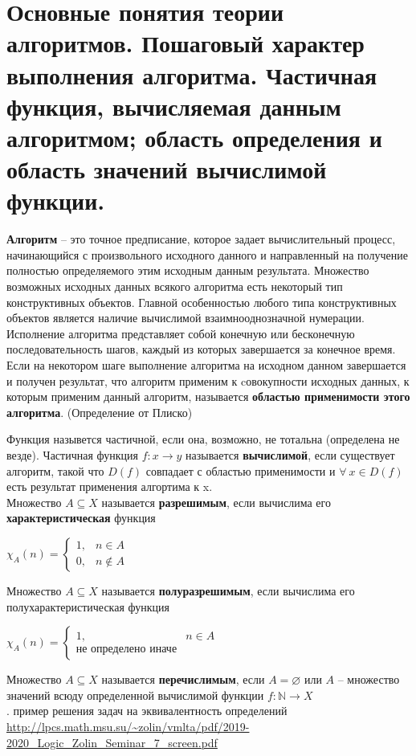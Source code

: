 \section{Основные понятия теории алгоритмов. Пошаговый характер выполнения алгоритма. Частичная функция, вычисляемая данным алгоритмом; область определения и область значений вычислимой функции.
}
\begin{definition}{
    \textbf{Алгоритм} -- это точное предписание, которое задает вычислительный процесс, начинающийся с произвольного исходного данного и направленный на получение полностью определяемого этим исходным данным результата. Множество возможных исходных данных всякого алгоритма есть некоторый тип конструктивных объектов. Главной особенностью любого типа конструктивных объектов является наличие вычислимой взаимнооднозначной нумерации. Исполнение алгоритма представляет собой конечную или бесконечную последовательность шагов, каждый из которых завершается за конечное время. Если на некотором шаге выполнение алгоритма на исходном данном завершается и получен результат, что алгоритм применим к cовокупности исходных данных, к которым применим данный алгоритм, называется \textbf{областью применимости этого алгоритма}. (Определение от Плиско)
  }
\end{definition}
Функция назывется частичной, если она, возможно, не тотальна (определена не везде). Частичная функция $f: x \rightarrow y$ называется \textbf{вычислимой}, если существует алгоритм, такой что $D(f)$ совпадает с областью применимости и $\forall \:x\in D(f)$ есть результат применения алгортима к x.\\
Множество $A\subseteq X$ называется \textbf{разрешимым}, если вычислима его \textbf{характеристическая} функция
\begin{center}
    $\chi_{A}(n)=\left\{\begin{array}{ll}
    {1,} & {n \in A} \\
    {0,} & {n \notin A}
    \end{array}\right.$
\end{center}
Множество $A\subseteq X$ называется \textbf{полуразрешимым}, если вычислима его полухарактеристическая функция 
    \begin{center}
        $\chi_{A}(n)=\left\{\begin{array}{ll}
        {1,} & {n \in A} \\
        \text{не определено иначе}
        \end{array}\right.$
    \end{center}
Множество $A\subseteq X$ называется \textbf{перечислимым}, если $A=\varnothing$ или $A$ -- множество значений всюду определенной вычислимой функции $f:\mathbb{N}\rightarrow X$\\.
\textcolor{mygray}{пример решения задач на эквивалентность определений \url{http://lpcs.math.msu.su/~zolin/vmlta/pdf/2019-2020_Logic_Zolin_Seminar_7_screen.pdf}}
